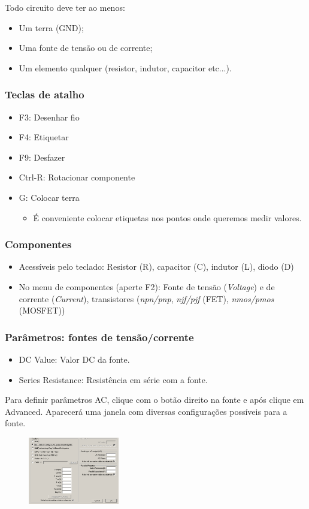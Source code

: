 \documentclass{beamer}
\begin{document}
\begin{frame} %
Todo circuito deve ter ao menos:
\begin{itemize}
\item Um terra (GND);
\item Uma fonte de tensão ou de corrente;
\item Um elemento qualquer (resistor, indutor, capacitor etc...).
\end{itemize}
\end{frame}

\begin{frame} %
\frametitle{Teclas de atalho}
\begin{itemize}
\item{F3:} Desenhar fio
\item{F4:} Etiquetar
\item{F9:} Desfazer 
\item{Ctrl-R:} Rotacionar componente
\item{G:} Colocar terra
\begin{itemize}
\item{É conveniente colocar etiquetas nos pontos onde queremos medir valores.}
\end{itemize}
\end{itemize}
\end{frame}

\begin{frame} %
\frametitle{Componentes}
\begin{itemize}
\item {Acessíveis pelo teclado:} Resistor (R), capacitor (C), indutor (L), diodo (D)
\item {No menu de componentes (aperte F2)}: Fonte de tensão (\textit{Voltage}) e de corrente (\textit{Current}), transistores (\textit{npn/pnp}, \textit{njf/pjf} (FET), \textit{nmos/pmos} (MOSFET))
\end{itemize}
\end{frame}

\begin{frame} %
\frametitle{Parâmetros: fontes de tensão/corrente}
\begin{itemize}
\item {DC Value}: Valor DC da fonte.
\item {Series Resistance}: Resistência em série com a fonte.
\end{itemize}
Para definir parâmetros AC, clique com o botão direito na fonte e após clique em Advanced. Aparecerá uma janela com diversas configurações possíveis para a fonte.
\begin{figure}[htb]
\includegraphics[width=150px]{images/paramfonte.png}
\end{figure}
\end{frame}
\end{document}
